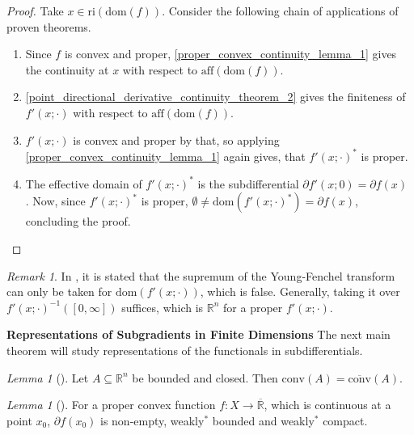 \documentclass[10pt, leqno]{amsart}
\theoremstyle{definition}
\theoremstyle{remark}
\newtheorem{lemma}[theorem]{Lemma}
\newtheorem{remark}[theorem]{Remark}
\newcommand{\draftcommentdone}{}
\begin{document}
    \begin{proof}
        \draftcommentdone Take \(x \in \text{ri}(\text{dom}(f))\). Consider the following chain of applications of proven theorems.
        \begin{enumerate}[wide]
            \item Since \(f\) is convex and proper,  \ref{proper_convex_continuity_lemma_1} gives the continuity at \(x\) with respect to \(\text{aff}(\text{dom}(f))\).
            \item {} \ref{point_directional_derivative_continuity_theorem_2} gives the finiteness of \(f'(x; \cdot)\) with respect to \(\text{aff}(\text{dom}(f))\).
            \item \(f'(x; \cdot)\) is convex and proper by that, so applying  \ref{proper_convex_continuity_lemma_1} again gives, that \(f'(x; \cdot)^*\) is proper.
            \item The effective domain of \(f'(x; \cdot)^*\) is the subdifferential \(\partial f'(x; 0) = \partial f(x)\) \cite[p. 196]{IoffeTihomirov}. Now, since \(f'(x; \cdot)^*\) is proper, \(\emptyset \neq \text{dom}(f'(x; \cdot)^*) = \partial f(x)\), concluding the proof.
        \end{enumerate}
    \end{proof}

    \begin{remark}
        In \cite[p. 172]{IoffeTihomirov}, it is stated that the supremum of the Young-Fenchel transform can only be taken for \(\text{dom}(f'(x; \cdot))\), which is false. Generally, taking it over \(f'(x; \cdot)^{-1}([0, \infty])\) suffices, which is \(\mathbb{R}^n\) for a proper \(f'(x; \cdot)\).
    \end{remark}
    
    \textbf{Representations of Subgradients in Finite Dimensions} The next main theorem will study representations of the functionals in subdifferentials.

    \begin{lemma}[{\cite[pp. 185-186]{IoffeTihomirov}}] \label{finite_dim_caratheodory_corollary}
        Let \(A \subseteq \mathbb{R}^n\) be bounded and closed. Then \(\text{conv}(A) = \overline{\text{conv}}(A)\).
    \end{lemma}

    \begin{lemma}[{\cite[p. 199]{IoffeTihomirov}}] \label{subdifferential_boundedness}
        For a proper convex function \(f\colon X \to \overline{\mathbb{R}}\), which is continuous at a point \(x_0\), \(\partial f(x_0)\) is non-empty, weakly\({}^*\) bounded and weakly\({}^*\) compact.
    \end{lemma}
\end{document}
